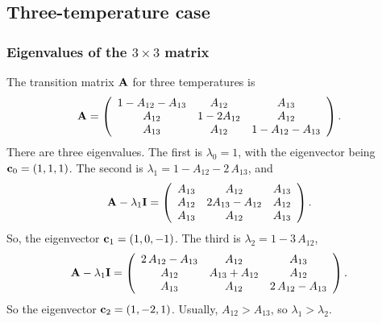 \documentclass[aip,jcp,preprint,notitlepage, superscriptaddress]{revtex4-1}
\begin{document}
\subsection{Three-temperature case}



\subsubsection{Eigenvalues of the $3\times 3$ matrix}


The transition matrix $\bm{\mathrm{A}}$
for three temperatures is
\begin{align*}
\bm{\mathrm{A}}
=
\left(
  \begin{array}{ccc}
    1 - A_{12} - A_{13}   &     A_{12}    &  A_{13}             \\
    A_{12}                &  1 - 2 A_{12} &  A_{12}             \\
    A_{13}                &     A_{12}    &  1 - A_{12} - A_{13}
  \end{array}
\right).
\end{align*}
%
There are three eigenvalues.
%
The first is $\lambda_0 = 1$,
with the eigenvector being $\bm{\mathrm{c}}_0 = (1, 1, 1)$.
%
The second is $\lambda_1 = 1 - A_{12} - 2 \, A_{13}$,
and
\begin{align*}
\bm{\mathrm{A}} - \lambda_1 \bm{\mathrm{I}}
=
\left(
  \begin{array}{ccc}
    A_{13}   &     A_{12}           &  A_{13} \\
    A_{12}   &  2 A_{13} - A_{12}   &  A_{12} \\
    A_{13}   &     A_{12}           &  A_{13}
  \end{array}
\right).
\end{align*}
%
So, the eigenvector $\bm{\mathrm{c}}_1 = (1, 0, -1)$.
%
The third is $\lambda_2 = 1 - 3 \, A_{12}$,
%
\begin{align*}
\bm{\mathrm{A}} - \lambda_1 \bm{\mathrm{I}}
=
\left(
  \begin{array}{ccc}
    2 \, A_{12} - A_{13}   &     A_{12}         &  A_{13} \\
    A_{12}                 &  A_{13} + A_{12}   &  A_{12} \\
    A_{13}                 &     A_{12}         &  2 \, A_{12} - A_{13}
  \end{array}
\right).
\end{align*}
%
So the eigenvector $\bm{\mathrm{c}}_2 = (1, -2, 1)$.
%
Usually,
$A_{12} > A_{13}$,
so $\lambda_1 > \lambda_2$.
\end{document}

